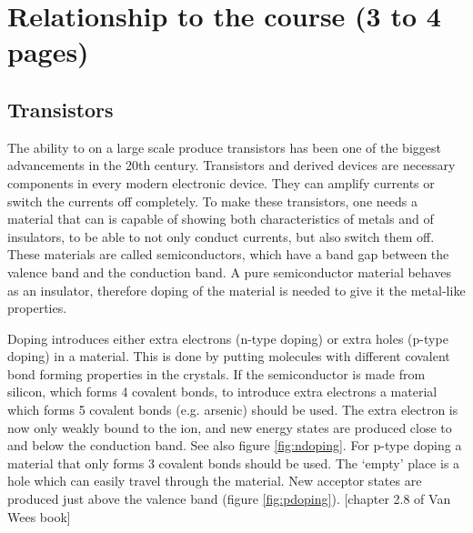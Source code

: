 \section{Relationship to the course (3 to 4 pages)}
% 
% 
% 


\subsection{Transistors}

The ability to on a large scale produce transistors has been one of the biggest advancements in the 20th century. Transistors and derived devices are necessary components in every modern electronic device. They can amplify currents or switch the currents off completely. To make these transistors, one needs a material that can is capable of showing both characteristics of metals and of insulators, to be able to not only conduct currents, but also switch them off. These materials are called semiconductors, which have a band gap between the valence band and the conduction band. A pure semiconductor material behaves as an insulator, therefore doping of the material is needed to give it the metal-like properties.

Doping introduces either extra electrons (n-type doping) or extra holes (p-type doping) in a material. This is done by putting molecules with different covalent bond forming properties in the crystals. If the semiconductor is made from silicon, which forms 4 covalent bonds, to introduce extra electrons a material which forms 5 covalent bonds (e.g. arsenic) should be used. The extra electron is now only weakly bound to the ion, and new energy states are produced close to and below the conduction band. See also figure \ref{fig:ndoping}. For p-type doping a material that only forms 3 covalent bonds should be used. The `empty' place is a hole which can easily travel through the material. New acceptor states are produced just above the valence band (figure \ref{fig:pdoping}). [chapter 2.8 of Van Wees book]

